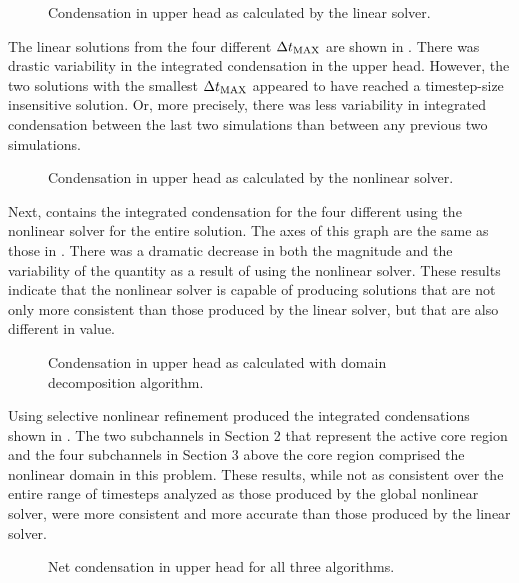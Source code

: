 \begin{figure}[h!tb]
\centering

\caption{Condensation in upper head as calculated by the linear solver.}
\label{fig:refillGammaLin}
\end{figure}

The linear solutions from the four different $\dtmax{}$ are shown in .
There was drastic variability in the integrated condensation in the upper head.
However, the two solutions with the smallest $\dtmax{}$ appeared to have reached a timestep-size insensitive solution.
Or, more precisely, there was less variability in integrated condensation between the last two simulations than between any previous two simulations.

\begin{figure}[h!tb]
\centering

\caption{Condensation in upper head as calculated by the nonlinear solver.}
\label{fig:refillGammaNln}
\end{figure}

Next,  contains the integrated condensation for the four different \dtmax{} using the nonlinear solver for the entire solution.
The axes of this graph are the same as those in .
There was a dramatic decrease in both the magnitude and the variability of the quantity as a result of using the nonlinear solver.
These results indicate that the nonlinear solver is capable of producing solutions that are not only more consistent than those produced by the linear solver, but that are also different in value.

\begin{figure}[h!tb]
\centering

\caption{Condensation in upper head as calculated with domain decomposition algorithm.}
\label{fig:refillGammaDom}
\end{figure}

Using selective nonlinear refinement produced the integrated condensations shown in .
The two subchannels in Section 2 that represent the active core region and the four subchannels in Section 3 above the core region comprised the nonlinear domain in this problem.
These results, while not as consistent over the entire range of timesteps analyzed as those produced by the global nonlinear solver, were more consistent and more accurate than those produced by the linear solver.

\begin{figure}[t!hb]
\centering

\caption{Net condensation in upper head for all three algorithms.}
\label{fig:refillMaxGamma}
\end{figure}

